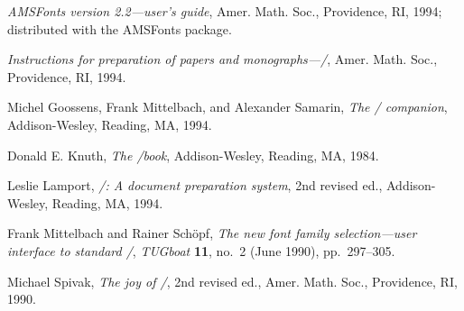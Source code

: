 \documentclass[leqno,titlepage,openany]{amsldoc}
\newcommand{\booktitle}[1]{\textit{#1}}
\newcommand{\journalname}[1]{\textit{#1}}
\begin{document}
\begin{thebibliography}{9}

\booktitle{AMSFonts version \textup{2.2}---user's guide},
Amer. Math. Soc., Providence, RI, 1994; distributed
with the AMSFonts package.

\booktitle{Instructions for preparation of
papers and monographs---\amslatex/},
Amer. Math. Soc., Providence, RI, 1994.

 Michel Goossens, Frank Mittelbach, and Alexander Samarin,
\booktitle{The \latex/ companion}, Addison-Wesley, Reading, MA, 1994.

 Donald E. Knuth, \booktitle{The \tex/book},
Addison-Wesley, Reading, MA, 1984.

 Leslie Lamport, \booktitle{\latex/: A document preparation
system}, 2nd revised ed., Addison-Wesley, Reading, MA, 1994.

 Frank Mittelbach and Rainer Sch\"opf,
\textit{The new font family selection---user
interface to standard \latex/}, \journalname{TUGboat} \textbf{11},
no.~2 (June 1990), pp.~297--305.

 Michael Spivak, \booktitle{The joy of \tex/}, 2nd revised ed.,
Amer. Math. Soc., Providence, RI, 1990.

\end{thebibliography}
\end{document}
